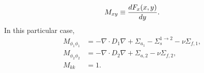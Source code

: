 \begin{equation}
M_{xy}\equiv \frac{d F_x(x,y)}{d y}.
\end{equation}
In this particular case,
\begin{align}
M_{\phi_1\phi_1}&=-\nabla\cdot D_1\nabla + \Sigma_{a_1} - \Sigma_s^{1\to2} - \nu\Sigma_{f,1},\\
M_{\phi_2\phi_2}&=-\nabla\cdot D_2\nabla + \Sigma_{a,2} - \nu\Sigma_{f,2},\\
M_{kk} &= 1.
\end{align}
